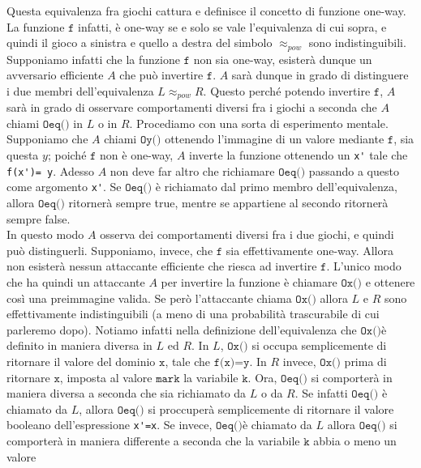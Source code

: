 \documentclass[a4paper,openright,twoside,12pt]{report}
\begin{document}
Questa equivalenza fra giochi cattura e definisce il concetto di funzione one-way. La funzione $\texttt{f}$ infatti, \`e one-way se e solo se vale l'equivalenza di cui sopra, 
e quindi il gioco a sinistra e quello a destra del simbolo \textbf{$\approx _{pow}$} sono indistinguibili.
Supponiamo infatti che la funzione $\texttt{f}$ non sia one-way, esister\`a dunque un avversario efficiente $A$ 
che pu\`o invertire $\texttt{f}$. $A$ sar\`a dunque in grado di distinguere i due membri dell'equivalenza $L \approx_{pow} R$. 
Questo perch\'e potendo invertire $\texttt{f}$, $A$ sar\`a in grado di osservare comportamenti diversi fra i giochi a seconda che $A$ chiami $\texttt{Oeq()}$ in $L$ o in $R$.
Procediamo con una sorta di esperimento mentale.\\ 
Supponiamo che $A$ chiami $\texttt{Oy()}$ ottenendo l'immagine di un valore mediante $\texttt{f}$, sia questa $y$; poich\'e $\texttt{f}$ non \`e one-way, 
$A$ inverte la funzione ottenendo un \verb!x'! tale che \verb!f(x')= y!.
Adesso $A$ non deve far altro che richiamare $\texttt{Oeq()}$ passando a questo come argomento \verb!x'!. Se $\texttt{Oeq()}$ \`e richiamato dal primo membro dell'equivalenza, 
allora $\texttt{Oeq()}$ ritorner\`a sempre true, mentre se appartiene al secondo ritorner\`a sempre false.\\
In questo modo $A$ osserva dei comportamenti diversi fra i due giochi, e quindi pu\`o distinguerli. 
Supponiamo, invece, che $\texttt{f}$ sia effettivamente one-way. Allora non esister\`a nessun attaccante efficiente che riesca ad invertire $\texttt{f}$.
L'unico modo che ha quindi un attaccante $A$ per invertire la funzione \`e chiamare $\texttt{Ox()}$ e ottenere cos\`i una preimmagine valida. 
Se però l'attaccante chiama $\texttt{Ox()}$ allora $L$ e $R$ sono effettivamente indistinguibili (a meno di una probabilit\`a trascurabile di cui parleremo dopo).
Notiamo infatti nella definizione dell'equivalenza che  $\texttt{Ox()}$\`e definito in maniera diversa in $L$ ed $R$.
In $L$, $\texttt{Ox()}$ si occupa semplicemente di ritornare il valore del dominio $\texttt{x}$, tale che $\texttt{f(x)=y}$. 
In $R$ invece, $\texttt{Ox()}$ prima di ritornare $\texttt{x}$, imposta al valore $\texttt{mark}$ la variabile $\texttt{k}$.
Ora, $\texttt{Oeq()}$ si comporter\`a in maniera diversa a seconda che sia richiamato da $L$ o da $R$.
Se infatti $\texttt{Oeq()}$ \`e chiamato da $L$, allora $\texttt{Oeq()}$ si proccuper\`a semplicemente di ritornare il valore booleano dell'espressione \verb!x'=x!.
Se invece,  $\texttt{Oeq()}$\`e chiamato da $L$ allora $\texttt{Oeq()}$ si comporter\`a in maniera differente a seconda che la variabile $\texttt{k}$ abbia o meno un valore 
\end{document}
